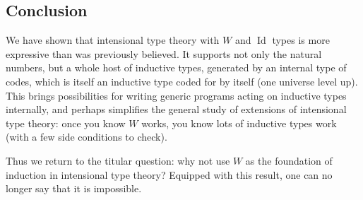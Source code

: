 \documentclass[a4paper,UKenglish,cleveref,nameinlink,autoref,thm-restate]{lipics-v2019}
\DeclareMathOperator{\Idop}{\mathrm{Id}}
\begin{document}
\subsection{Conclusion}

We have shown that intensional type theory with $W$ and $\Idop$ types is more expressive than was previously believed. It supports not only the natural numbers, but a whole host of inductive types, generated by an internal type of codes, which is itself an inductive type coded for by itself (one universe level up). This brings possibilities for writing generic programs acting on inductive types internally, and perhaps simplifies the general study of extensions of intensional type theory: once you know $W$ works, you know lots of inductive types work (with a few side conditions to check).

Thus we return to the titular question: why not use $W$ as the foundation of induction in intensional type theory? Equipped with this result, one can no longer say that it is impossible.





\appendix
\end{document}
